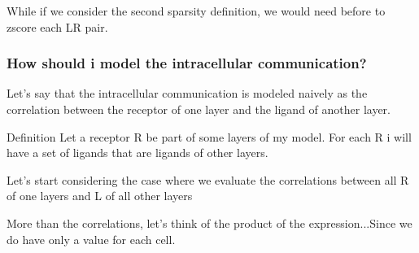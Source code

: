 \begin{frame}
    While if we consider the second sparsity definition, we would need before to zscore each LR pair.
\end{frame}


\begin{frame}
    \frametitle{How should i model the intracellular communication?}
    Let's say that the intracellular communication is modeled naively as the correlation between the receptor of 
    one layer and the ligand of another layer.

    \begin{block}{Definition}
        Let a receptor R be part of some layers of my model. For each R i will have a set
        of ligands  that are ligands of other layers.

        Let's start considering the case where we evaluate the correlations between all R of one layers and L of all other layers

        More than the correlations, let's think of the product of the expression...Since we do have only a value for each cell.
    \end{block}

\end{frame}

